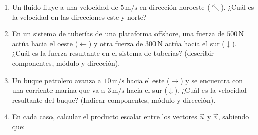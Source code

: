 \documentclass[11pt]{article}
\begin{document}
\begin{enumerate}[\hspace{-3mm}$1)$]
\begin{enumerate}[a) ]
\begin{minipage}{.45\textwidth}
\begin{center}


\end{center}
\end{minipage}

\end{enumerate}























\item  Un fluido fluye a una velocidad de $5\,\text{m/s}$ en dirección noroeste ($\nwarrow$). ¿Cuál es la velocidad en las direcciones este y norte?




















\item  En un sistema de tuberías de una plataforma offshore, una fuerza de $500\,\text{N}$ actúa hacia el oeste ($\leftarrow$) y otra fuerza de $300\,\text{N}$ actúa hacia el sur ($\downarrow$). ¿Cuál es la fuerza resultante en el sistema de tuberías? (describir componentes, módulo y dirección).









\item  Un buque petrolero avanza a $10\,\text{m/s}$ hacia el este ($\rightarrow$) y se encuentra con una corriente marina que va a $3\,\text{m/s}$ hacia el sur ($\downarrow$). ¿Cuál es la velocidad resultante del buque? (Indicar componentes, módulo y dirección).










\item  En cada caso, calcular el producto escalar entre los vectores $\vec{u}$ y $\vec{v}$, sabiendo que:


\end{enumerate}
\end{document}
